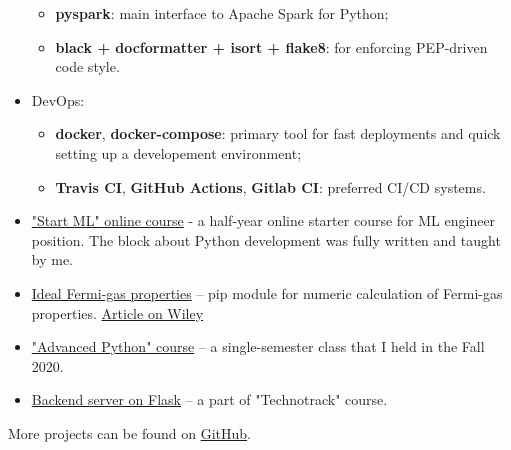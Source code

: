 \begin{itemize}
\begin{itemize}
            \item \textbf{pyspark}: main interface to Apache Spark for Python;
            \item \textbf{black + docformatter + isort + flake8}: for enforcing PEP-driven code style.
        \end{itemize}
    \item DevOps: 
        \begin{itemize}
            \item \textbf{docker}, \textbf{docker-compose}: primary tool for fast deployments and quick setting up a developement environment;
            \item \textbf{Travis CI}, \textbf{GitHub Actions}, \textbf{Gitlab CI}: preferred CI/CD systems.
        \end{itemize}
\end{itemize}

\begin{itemize}
    \item \href{https://karpov.courses/ml-start}{"Start ML" online course} - a half-year online starter course for ML engineer position. The block about Python development was fully written and taught by me.
    \item \href{https://github.com/alekseik1/ifg-py}{Ideal Fermi-gas properties} -- pip module for numeric calculation of Fermi-gas properties. \href{http://dx.doi.org/10.1002/ctpp.202100139}{Article on Wiley}
    \item \href{https://github.com/alekseik1/advanced_python_1sem_2020}{"Advanced Python" course} -- a single-semester class that I held in the Fall 2020.
    \item \href{https://github.com/alekseik1/tt-ridesharing-backend}{Backend server on Flask} -- a part of "Technotrack" course.
\end{itemize}
More projects can be found on \href{https://github.com/alekseik1/}{GitHub}.

